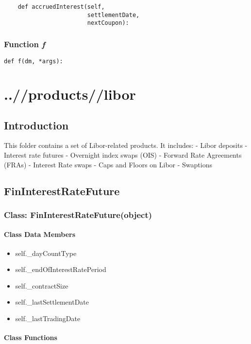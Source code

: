 \documentclass[twoside,11pt]{book}
\begin{document}
\begin{lstlisting}
    def accruedInterest(self,
                        settlementDate,
                        nextCoupon):
\end{lstlisting}

\subsection{Function {\it f}}


\begin{lstlisting}
def f(dm, *args):
\end{lstlisting}


\chapter{..//products//libor}
\section{Introduction}
This folder contains a set of Libor-related products. It includes:
- Libor deposits
- Interest rate futures
- Overnight index swaps (OIS)
- Forward Rate Agreements (FRAs)
- Interest Rate swaps
- Caps and Floors on Libor
- Swaptions

\newpage
\section{FinInterestRateFuture}

\subsection{Class: FinInterestRateFuture(object)}


\subsubsection{Class Data Members}
\begin{itemize}
\item{self.\_dayCountType}
\item{self.\_endOfInterestRatePeriod}
\item{self.\_contractSize}
\item{self.\_lastSettlementDate}
\item{self.\_lastTradingDate}
\end{itemize}

\subsubsection{Class Functions}
\end{document}
